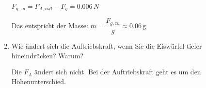 \documentclass[11pt]{article}
\begin{document}
\begin{enumerate}[label=(\alph*)]
    \color{OliveGreen}
    $F_{g,zu} = F_{A,voll} - F_g = 0.006\,N$
    
    Das entspricht der Masse: $m = \dfrac{F_{g,zu}}{g} \approx 0.06\,$g 
    \color{black}


    
    \item Wie ändert sich die Auftriebskraft, wenn Sie die Eiswürfel tiefer hineindrücken? Warum?

    \color{OliveGreen}
    Die $F_A$ ändert sich nicht. Bei der Auftriebskraft geht es um den Höhenunterschied. 
    \color{black}

\end{enumerate}
\end{document}
